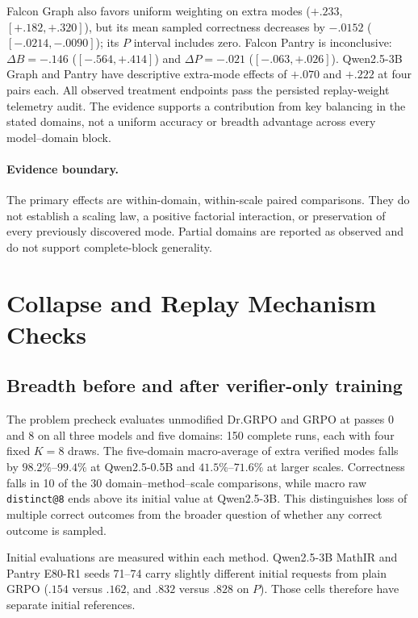\documentclass{article}
\newcommand{\1}{\mathbf 1}
\theoremstyle{remark}
\theoremstyle{definition}
\theoremstyle{plain}
\begin{document}
Falcon Graph also favors uniform weighting on extra modes ($+.233$,
$[+.182,+.320]$), but its mean sampled correctness decreases by $-.0152$
($[-.0214,-.0090]$); its $P$ interval includes zero. Falcon Pantry is
inconclusive: $\Delta B=-.146$ ($[-.564,+.414]$) and $\Delta P=-.021$
($[-.063,+.026]$). Qwen2.5-3B Graph and Pantry have descriptive extra-mode
effects of $+.070$ and $+.222$ at four pairs each. All observed treatment
endpoints pass the persisted replay-weight telemetry audit. The evidence
supports a contribution from key balancing in the stated domains, not a
uniform accuracy or breadth advantage across every model--domain block.

\paragraph{Evidence boundary.}
\label{app:scale-boundary}
The primary effects are within-domain, within-scale paired comparisons.
They do not establish a scaling law, a positive factorial interaction, or
preservation of every previously discovered mode. Partial domains are
reported as observed and do not support complete-block generality.

\section{Collapse and Replay Mechanism Checks}
\label{app:ablations}

\subsection{Breadth before and after verifier-only training}
\label{app:pre-rl-regression}

The problem precheck evaluates unmodified Dr.GRPO and GRPO at passes 0 and 8
on all three models and five domains: 150 complete runs, each with four
fixed $K=8$ draws. The five-domain macro-average of extra verified modes
falls by $98.2\%$--$99.4\%$ at Qwen2.5-0.5B and $41.5\%$--$71.6\%$ at
larger scales. Correctness falls in 10 of the 30 domain--method--scale
comparisons, while macro raw \texttt{distinct@8} ends above its initial
value at Qwen2.5-3B. This distinguishes loss of multiple correct outcomes
from the broader question of whether any correct outcome is sampled.

Initial evaluations are measured within each method. Qwen2.5-3B MathIR
and Pantry E80-R1 seeds 71--74 carry slightly different initial requests
from plain GRPO ($.154$ versus $.162$, and $.832$ versus $.828$ on $P$).
Those cells therefore have separate initial references.
\end{document}

